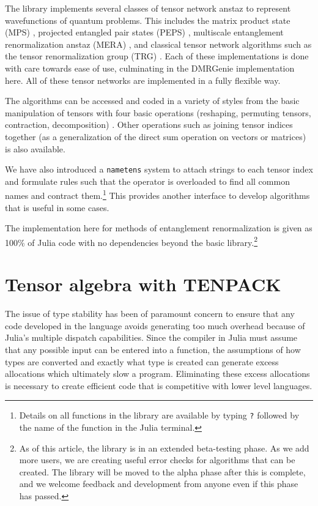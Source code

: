 \documentclass{juliacon}
\begin{document}
The library implements several classes of tensor network anstaz to represent wavefunctions of quantum problems. This includes the matrix product state (MPS) \cite{verstraete2006matrix,baker2024bundled}, projected entangled pair states (PEPS) \cite{verstraete2004renormalization}, multiscale entanglement renormalization anstaz (MERA) \cite{vidal2007entanglement}, and classical tensor network algorithms such as the tensor renormalization group (TRG) \cite{levin2007tensor}. Each of these implementations is done with care towards ease of use, culminating in the DMRGenie implementation here.  All of these tensor networks are implemented in a fully flexible way.

The algorithms can be accessed and coded in a variety of styles from the basic manipulation of tensors with four basic operations (reshaping, permuting tensors, contraction, decomposition) \cite{bakerCJP21,baker2019m,dmrjulia1}. Other operations such as joining tensor indices together (as a generalization of the direct sum operation on vectors or matrices) is also available. 

We have also introduced a {\tt nametens} system to attach strings to each tensor index and formulate rules such that the {\tt *} operator is overloaded to find all common names and contract them.\footnote{Details on all functions in the library are available by typing {\tt ?} followed by the name of the function in the Julia terminal.} This provides another interface to develop algorithms that is useful in some cases.

The implementation here for methods of entanglement renormalization is given as 100\% of Julia code with no dependencies beyond the basic library.\footnote{As of this article, the library is in an extended beta-testing phase. As we add more users, we are creating useful error checks for algorithms that can be created. The library will be moved to the alpha phase after this is complete, and we welcome feedback and development from anyone even if this phase has passed.}

\section{Tensor algebra with TENPACK}

The issue of type stability has been of paramount concern to ensure that any code developed in the language avoids generating too much overhead because of Julia's multiple dispatch capabilities. Since the compiler in Julia must assume that any possible input can be entered into a function, the assumptions of how types are converted and exactly what type is created can generate excess allocations which ultimately slow a program. Eliminating these excess allocations is necessary to create efficient code that is competitive with lower level languages.
\end{document}
